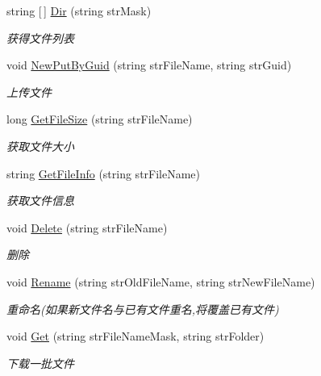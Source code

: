 \begin{DoxyCompactItemize}
string \mbox{[}$\,$\mbox{]} \hyperlink{class_x_c_l_net_tools_1_1_f_t_p_1_1_f_t_p_client_a9563c1fa35e755073b9b279caaf7e354}{Dir} (string str\+Mask)
\begin{DoxyCompactList}\small\item\em 获得文件列表 \end{DoxyCompactList}\item 
void \hyperlink{class_x_c_l_net_tools_1_1_f_t_p_1_1_f_t_p_client_a090074dcb39c2ca5aa3f78bc02df19db}{New\+Put\+By\+Guid} (string str\+File\+Name, string str\+Guid)
\begin{DoxyCompactList}\small\item\em 上传文件 \end{DoxyCompactList}\item 
long \hyperlink{class_x_c_l_net_tools_1_1_f_t_p_1_1_f_t_p_client_a39be7d18214835a62484226fc12e2061}{Get\+File\+Size} (string str\+File\+Name)
\begin{DoxyCompactList}\small\item\em 获取文件大小 \end{DoxyCompactList}\item 
string \hyperlink{class_x_c_l_net_tools_1_1_f_t_p_1_1_f_t_p_client_abcdeced5a90923ad5788251d4012694f}{Get\+File\+Info} (string str\+File\+Name)
\begin{DoxyCompactList}\small\item\em 获取文件信息 \end{DoxyCompactList}\item 
void \hyperlink{class_x_c_l_net_tools_1_1_f_t_p_1_1_f_t_p_client_a1be296574d7342283c236d8b51ca2b04}{Delete} (string str\+File\+Name)
\begin{DoxyCompactList}\small\item\em 删除 \end{DoxyCompactList}\item 
void \hyperlink{class_x_c_l_net_tools_1_1_f_t_p_1_1_f_t_p_client_aaadb1ae86c64e8ec958e8333fc6b9bce}{Rename} (string str\+Old\+File\+Name, string str\+New\+File\+Name)
\begin{DoxyCompactList}\small\item\em 重命名(如果新文件名与已有文件重名,将覆盖已有文件) \end{DoxyCompactList}\item 
void \hyperlink{class_x_c_l_net_tools_1_1_f_t_p_1_1_f_t_p_client_a67852a51f561336c777b896af2e95990}{Get} (string str\+File\+Name\+Mask, string str\+Folder)
\begin{DoxyCompactList}\small\item\em 下载一批文件 \end{DoxyCompactList}\item 

\end{DoxyCompactItemize}
